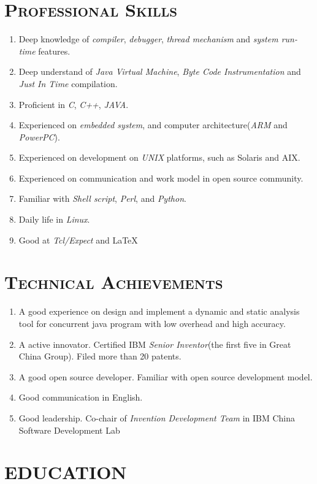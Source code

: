 \begin{resume}
\section{\textsc{Professional Skills}}
\begin{enumerate} 
\item[] Deep knowledge of \emph{compiler}, \emph{debugger}, \emph{thread mechanism} and \emph{system run-time} features.
\item[] Deep understand of \emph{Java Virtual Machine}, \emph{Byte Code Instrumentation} and \emph{Just In Time} compilation.
\item[] Proficient in \emph{C}, \emph{C++}, \emph{JAVA}.
\item[] Experienced on \emph{embedded system}, and computer architecture(\emph{ARM} and \emph{PowerPC}).
\item[] Experienced on development on \emph{UNIX} platforms, such as Solaris and AIX.
\item[] Experienced on communication and work model in open source community.
\item[] Familiar with \emph{Shell script}, \emph{Perl}, and \emph{Python}.
\item[] Daily life in \emph{Linux}.
\item[] Good at \emph{Tcl/Expect} and 
 \LaTeX
\end{enumerate}

\section{\textsc{Technical Achievements}}
\begin{enumerate}
\item[] A good experience on design and implement a dynamic and static analysis tool for concurrent java program with low overhead and high accuracy.
\item[] A active innovator.  Certified IBM \emph{Senior Inventor}(the first five in Great China Group).  Filed more than 20 patents.
\item[] A good open source developer.  Familiar with open source development model.
\item[] Good communication in English.
\item[] Good leadership.  Co-chair of \emph{Invention Development Team} in IBM China Software Development Lab
\end{enumerate}

\section{\textsc{EDUCATION}}


\end{resume}
